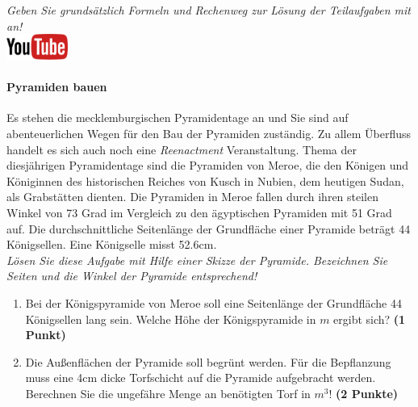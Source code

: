 \documentclass[a4paper, 9pt]{scrartcl}\usepackage[]{graphicx}\usepackage[]{xcolor}
\begin{document}
\textit{Geben Sie grunds{\"a}tzlich Formeln und Rechenweg zur L{\"o}sung der
  Teilaufgaben mit an!} \\[1Ex]

\hfill\href{https://youtu.be/tDgr6fpkkYA}{\includegraphics[width =
  2cm]{img/youtube}} %
\hspace{2Ex}

\paragraph{Pyramiden bauen}



Es stehen die mecklemburgischen Pyramidentage an und Sie sind auf
abenteuerlichen Wegen f{\"u}r den Bau der Pyramiden zust{\"a}ndig. Zu allem
{\"U}berfluss handelt es sich auch noch eine \textit{Reenactment}
Veranstaltung. Thema der diesj{\"a}hrigen Pyramidentage sind die Pyramiden von
Meroe, die den K{\"o}nigen und K{\"o}niginnen des historischen Reiches von Kusch in
Nubien, dem heutigen Sudan, als Grabst{\"a}tten dienten. Die Pyramiden in Meroe
fallen durch ihren steilen Winkel von 73 Grad im Vergleich zu
den {\"a}gyptischen Pyramiden mit 51 Grad auf. Die durchschnittliche
Seitenl{\"a}nge der Grundfl{\"a}che einer Pyramide betr{\"a}gt 44 K{\"o}nigsellen. Eine K{\"o}nigselle
misst 52.6cm.\\

\textit{L{\"o}sen Sie diese Aufgabe mit Hilfe einer Skizze der Pyramide. Bezeichnen
  Sie Seiten und die Winkel der Pyramide entsprechend!}

\begin{enumerate}
\item Bei der K{\"o}nigspyramide von Meroe soll eine Seitenl{\"a}nge der Grundfl{\"a}che
  44 K{\"o}nigsellen lang sein. Welche H{\"o}he der K{\"o}nigspyramide in $m$
  ergibt sich? \textbf{(1 Punkt)}
\item Die Au{\ss}enfl{\"a}chen der Pyramide soll begr{\"u}nt werden. F{\"u}r die
  Bepflanzung muss eine 4cm dicke Torfschicht auf die
  Pyramide aufgebracht werden. Berechnen Sie die ungef{\"a}hre Menge an
  ben{\"o}tigten Torf in $m^3$! \textbf{(2 Punkte)}
\end{enumerate}
\end{document}

